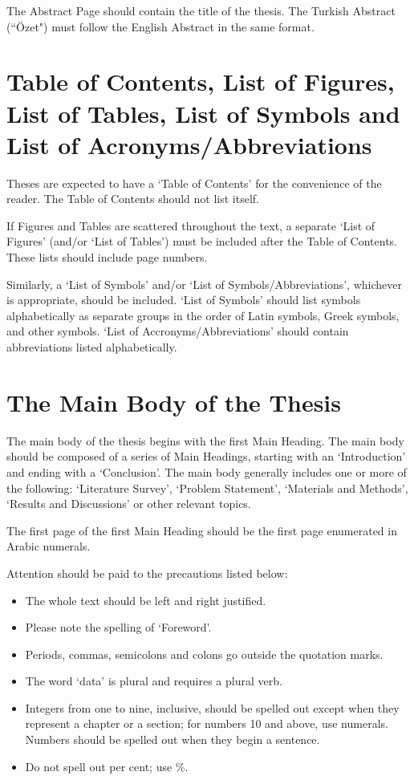 \documentclass[a4paper,oneside,12pt]{report}
\numberwithin{equation}{chapter}
\begin{document}
The Abstract Page should contain the title of the thesis. The Turkish Abstract (``\"{O}zet") must follow the English Abstract in the same format.


\section{Table of Contents, List of Figures, List of
Tables, List
of Symbols and List of Acronyms/Abbreviations}
Theses are expected to have a `Table of Contents' for the convenience
of the reader. The Table of Contents should not list itself.

If Figures and Tables are scattered throughout the text, a
separate `List of Figures' (and/or `List of Tables') must be included
after the Table of Contents. These lists should include page numbers.

Similarly, a `List of Symbols' and/or `List of Symbols/Abbreviations', whichever is
appropriate, should be included. `List of Symbols' should list symbols alphabetically as separate groups in the order of Latin symbols, Greek symbols, and other symbols. `List of Accronyms/Abbreviations' should contain abbreviations listed alphabetically.

\section{The Main Body of the Thesis}
The main body of the thesis begins with the first Main Heading. The main body
should be composed of a series of Main Headings, starting with an
`Introduction' and ending with a `Conclusion'. The
main body generally includes one or more of the following: `Literature Survey', `Problem Statement', `Materials and Methods', `Results and Discussions' or other relevant topics.

The first page of the first Main Heading should be the first page
enumerated in Arabic numerals. 

Attention should be paid to the precautions listed below:

\begin{itemize}
\item The whole text should be left and right justified.
\item Please note the spelling of `Foreword'.
\item Periods, commas, semicolons and colons go outside the quotation
marks.
\item The word `data' is plural and requires a plural verb.
\item Integers from one to nine, inclusive, should be spelled out
except when they represent a chapter or a section; for numbers 10 and
above, use numerals. Numbers should be spelled out when they begin a
sentence.
\item Do not spell out per cent; use \%.
\end{itemize}
\end{document}
